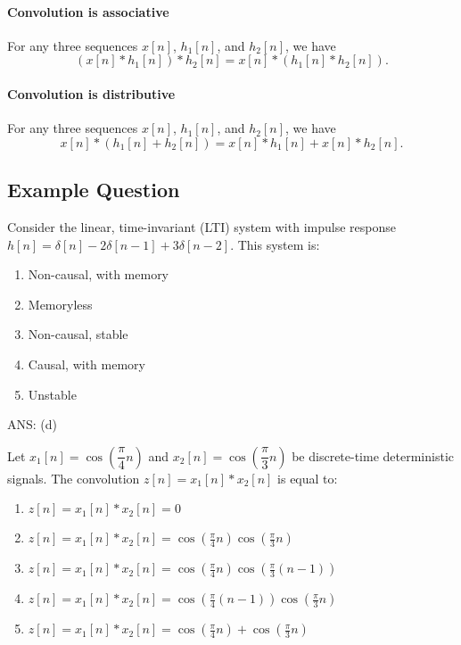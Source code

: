 \paragraph{Convolution is associative} For any three sequences $x[n]$, $h_1[n]$, and $h_2[n]$, we have
\[
    (x[n] * h_1[n]) * h_2[n] = x[n] * (h_1[n] * h_2[n]).
\]

\paragraph{Convolution is distributive} For any three sequences $x[n]$, $h_1[n]$, and $h_2[n]$, we have
\[
    x[n] * (h_1[n] + h_2[n]) = x[n] * h_1[n] + x[n] * h_2[n].
\]


\subsection{Example Question}
\begin{q}{}
Consider the linear, time-invariant (LTI) system with impulse response $h[n] = \delta[n] - 2\delta[n-1] + 3\delta[n-2]$. This system is:
\begin{enumerate}[label=(\alph*)]
    \item Non-causal, with memory
    \item Memoryless
    \item Non-causal, stable
    \item Causal, with memory
    \item Unstable
\end{enumerate}

\begin{flushright}
    \begin{blueenv}
        ANS: (d)
    \end{blueenv}
\end{flushright}
\end{q}
\begin{q}{}
Let $x_{1}[n] = \cos\left(\dfrac{\pi}{4} n\right)$ and $x_{2}[n] = \cos\left(\dfrac{\pi}{3}n\right)$ be discrete-time deterministic signals. The convolution $z[n] = x_{1}[n] * x_{2}[n]$ is equal to:

\begin{enumerate}[label=(\alph*)]
    \item $z[n] = x_{1}[n] * x_{2}[n] = 0$
    \item $z[n] = x_{1}[n] * x_{2}[n] = \cos(\frac{\pi}{4} n) \cos(\frac{\pi}{3}n)$
    \item $z[n] = x_{1}[n] * x_{2}[n] = \cos(\frac{\pi}{4} n) \cos(\frac{\pi}{3}(n-1))$
    \item $z[n] = x_{1}[n] * x_{2}[n] = \cos(\frac{\pi}{4} (n-1)) \cos(\frac{\pi}{3}n)$
    \item $z[n] = x_{1}[n] * x_{2}[n] = \cos(\frac{\pi}{4} n) + \cos(\frac{\pi}{3}n)$
\end{enumerate}
\end{q}
